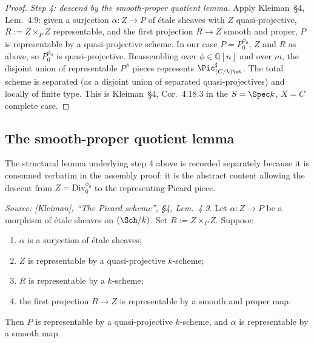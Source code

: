 \begin{proof}
  \emph{Step 4: descend by the smooth-proper quotient lemma.}
  Apply Kleiman~\S 4, Lem.~4.9: given a surjection \(\alpha : Z \to P\)
  of \'etale sheaves with \(Z\) quasi-projective, \(R := Z \times_P Z\)
  representable, and the first projection \(R \to Z\) smooth and proper,
  \(P\) is representable by a quasi-projective scheme. In our case
  \(P = P^{\phi_0}_0\), \(Z\) and \(R\) as above, so \(P^{\phi_0}_0\) is
  quasi-projective. Reassembling over \(\phi \in \mathbb{Q}[n]\) and
  over \(m\), the disjoint union of representable \(P^\phi\) pieces represents
  \(\Pic^\sharp_{(C/k)\et}\). The total scheme is separated (as a disjoint
  union of separated quasi-projectives) and locally of finite type. This
  is Kleiman~\S 4, Cor.~4.18.3 in the \(S = \Spec k\),
  \(X = C\) complete case.
\end{proof}

\subsection{The smooth-proper quotient lemma}
\label{subsec:fga_pic_qt}

The structural lemma underlying step 4 above is recorded separately
because it is consumed verbatim in the assembly proof: it is the
abstract content allowing the descent from \(Z = \mathrm{Div}^{\phi_0}_0\) to the
representing Picard piece.

\begin{lemma}
  \label{lem:smooth_proper_quotient}
  \textit{Source: [Kleiman], ``The Picard scheme'', \S 4, Lem.~4.9.}
  Let \(\alpha : Z \to P\) be a morphism of \'etale sheaves on \((\Sch/k)\).
  Set \(R := Z \times_P Z\). Suppose:
  \begin{enumerate}
    \item \(\alpha\) is a surjection of \'etale sheaves;
    \item \(Z\) is representable by a quasi-projective \(k\)-scheme;
    \item \(R\) is representable by a \(k\)-scheme;
    \item the first projection \(R \to Z\) is representable by a smooth
      and proper map.
  \end{enumerate}
  Then \(P\) is representable by a quasi-projective \(k\)-scheme, and \(\alpha\)
  is representable by a smooth map.
\end{lemma}


